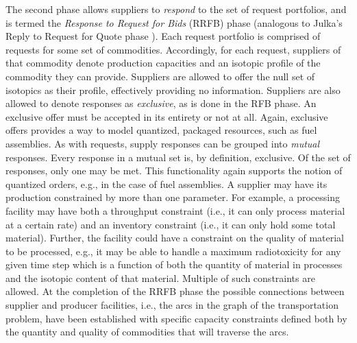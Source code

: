The second phase allows suppliers to \textit{respond} to the set of request
portfolios, and is termed the \textit{Response to Request for Bids} (RRFB) phase
(analogous to Julka's Reply to Request for Quote phase
\cite{julka_agent-based_2002}). Each request portfolio is comprised of requests
for some set of commodities. Accordingly, for each request, suppliers of that
commodity denote production capacities and an isotopic profile of the commodity
they can provide. Suppliers are allowed to offer the null set of isotopics as
their profile, effectively providing no information. Suppliers are also allowed
to denote responses as \textit{exclusive}, as is done in the RFB phase. An
exclusive offer must be accepted in its entirety or not at all. Again, exclusive
offers provides a way to model quantized, packaged resources, such as fuel
assemblies. As with requests, supply responses can be grouped into
\textit{mutual} responses. Every response in a mutual set is, by definition,
exclusive. Of the set of responses, only one may be met. This functionality
again supports the notion of quantized orders, e.g., in the case of fuel
assemblies. A supplier may have its production constrained by more than one
parameter. For example, a processing facility may have both a throughput
constraint (i.e., it can only process material at a certain rate) and an
inventory constraint (i.e., it can only hold some total material). Further, the
facility could have a constraint on the quality of material to be processed,
e.g., it may be able to handle a maximum radiotoxicity for any given time step
which is a function of both the quantity of material in processes and the
isotopic content of that material. Multiple of such constraints are allowed. At
the completion of the RRFB phase the possible connections between supplier and
producer facilities, i.e., the arcs in the graph of the transportation problem,
have been established with specific capacity constraints defined both by the
quantity and quality of commodities that will traverse the arcs.

